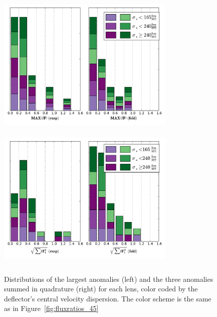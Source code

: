 \begin{figure}
	{\includegraphics[trim=0cm 0.2cm 0cm 0.3cm,clip,width=8.5cm, height=6.85cm]{./figures_sls/maxanomaly_dis-eps-converted-to.pdf}}
	{\includegraphics[trim=0cm 0.2cm 0cm 0.3cm,clip,width=8.5cm, height=7cm]{./figures_sls/sumquad_dis-eps-converted-to.pdf}}
	\caption{\label{fig:distributions_45}Distributions of the largest anomalies (left) and the three anomalies summed in quadrature (right) for each lens, color coded by the deflector's central velocity dispersion. The color scheme is the same as in Figure~\ref{fig:fluxratios_45}}
\end{figure}
